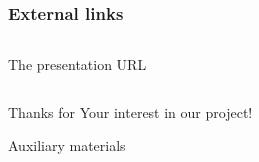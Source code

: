 \documentclass[10pt]{beamer}
\begin{document}
\begin{frame}
  \frametitle{External links}
  \begin{columns}
    \begin{column}{0.5\textwidth}\centering
      The presentation URL
    \end{column}
  \end{columns}
\end{frame}

\begin{frame}
  \begin{center}
  \Large Thanks for Your interest in our project!
\end{center}
\end{frame}

\begin{frame}
  \begin{center}
  \Large Auxiliary materials
\end{center}
\end{frame}
\end{document}
